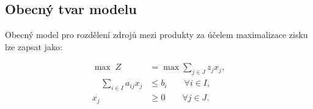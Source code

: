 \documentclass[../sablona-main.tex]{subfiles}
\begin{document}
	\subsection{Obecný tvar modelu}
	Obecný model pro rozdělení zdrojů mezi produkty za účelem maximalizace zisku lze zapsat jako:
	
	\begin{align}
		\max\; Z &=\max \sum_{j\in J} z_j x_j,\\
		\quad 
		\sum_{i\in I} a_{ij} x_j &\le b_i \qquad \forall i\in I,\\
		x_j &\ge 0 \qquad \forall j\in J .
	\end{align}
	
\end{document}
